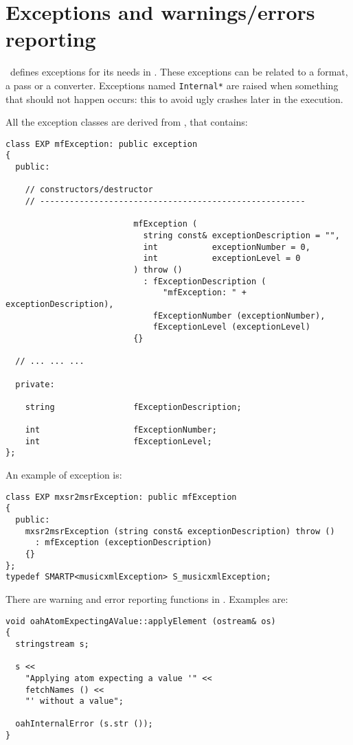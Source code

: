\section{Exceptions and warnings/errors reporting}

\mf\ defines exceptions for its needs in . These exceptions can be related to a format, a pass or a converter. Exceptions named {\tt *Internal*} are raised when something that should not happen occurs: this to avoid ugly crashes later in the execution.

All the exception classes are derived from {\tt }, that contains:
\begin{lstlisting}[language=CPlusPlus]
class EXP mfException: public exception
{
  public:

    // constructors/destructor
    // ------------------------------------------------------

                          mfException (
                            string const& exceptionDescription = "",
                            int           exceptionNumber = 0,
                            int           exceptionLevel = 0
                          ) throw ()
                            : fExceptionDescription (
                                "mfException: " + exceptionDescription),
                              fExceptionNumber (exceptionNumber),
                              fExceptionLevel (exceptionLevel)
                          {}

  // ... ... ...

  private:

    string                fExceptionDescription;

    int                   fExceptionNumber;
    int                   fExceptionLevel;
};
\end{lstlisting}

An example of exception is:
\begin{lstlisting}[language=CPlusPlus]
class EXP mxsr2msrException: public mfException
{
  public:
    mxsr2msrException (string const& exceptionDescription) throw ()
      : mfException (exceptionDescription)
    {}
};
typedef SMARTP<musicxmlException> S_musicxmlException;
\end{lstlisting}

There are warning and error reporting functions in .
Examples are:
\begin{lstlisting}[language=CPlusPlus]
void oahAtomExpectingAValue::applyElement (ostream& os)
{
  stringstream s;

  s <<
    "Applying atom expecting a value '" <<
    fetchNames () <<
    "' without a value";

  oahInternalError (s.str ());
}
\end{lstlisting}

